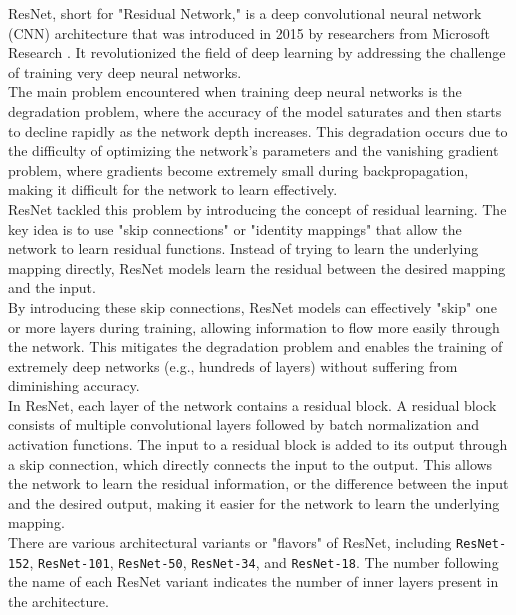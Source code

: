 ResNet, short for "Residual Network," is a deep convolutional neural network (CNN) architecture that was introduced in 2015 by researchers from Microsoft Research \cite{ResNetPaper}. It revolutionized the field of deep learning by addressing the challenge of training very deep neural networks. \\

The main problem encountered when training deep neural networks is the degradation problem, where the accuracy of the model saturates and then starts to decline rapidly as the network depth increases. This degradation occurs due to the difficulty of optimizing the network's parameters and the vanishing gradient problem, where gradients become extremely small during backpropagation, making it difficult for the network to learn effectively. \\

ResNet tackled this problem by introducing the concept of residual learning. The key idea is to use "skip connections" or "identity mappings" that allow the network to learn residual functions. Instead of trying to learn the underlying mapping directly, ResNet models learn the residual between the desired mapping and the input. \\

By introducing these skip connections, ResNet models can effectively "skip" one or more layers during training, allowing information to flow more easily through the network. This mitigates the degradation problem and enables the training of extremely deep networks (e.g., hundreds of layers) without suffering from diminishing accuracy. \\

In ResNet, each layer of the network contains a residual block. A residual block consists of multiple convolutional layers followed by batch normalization and activation functions. The input to a residual block is added to its output through a skip connection, which directly connects the input to the output. This allows the network to learn the residual information, or the difference between the input and the desired output, making it easier for the network to learn the underlying mapping.  \\

There are various architectural variants or "flavors" of ResNet, including {\tt ResNet-152}, {\tt ResNet-101}, {\tt ResNet-50}, {\tt ResNet-34}, and {\tt ResNet-18}. The number following the name of each ResNet variant indicates the number of inner layers present in the architecture.

